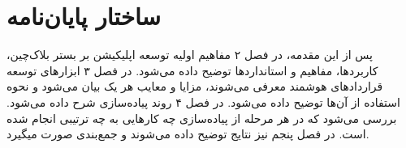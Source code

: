 \section{ساختار پایان‌نامه}
پس از این مقدمه، در فصل ۲ مفاهیم اولیه توسعه اپلیکیشن بر بستر بلاک‌چین، کاربردها، مفاهیم و استاندارد‌ها توضیح داده می‌شود. در فصل ۳ ابزار‌های توسعه قرارداد‌های هوشمند معرفی می‌شوند، مزایا و معایب هر یک بیان می‌شود و نحوه استفاده از آن‌ها توضیح داده می‌شود. در فصل ۴ روند پیاده‌سازی شرح داده می‌شود. بررسی می‌شود که در هر مرحله از پیاده‌سازی چه کارهایی به چه ترتیبی انجام شده است. در فصل پنجم نیز نتایج توضیح داده می‌شوند و جمع‌بندی صورت میگیرد.
